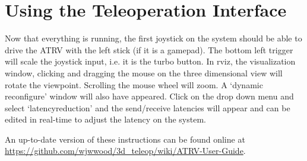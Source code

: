 \documentclass[12pt]{report}
\begin{document}
\section{Using the Teleoperation Interface}
Now that everything is running, the first joystick on the system should be able to drive the ATRV with the left stick (if it is a gamepad).  The bottom left trigger will scale the joystick input, i.e. it is the turbo button.  In rviz, the visualization window, clicking and dragging the mouse on the three dimensional view will rotate the viewpoint.  Scrolling the mouse wheel will zoom.  A `dynamic reconfigure' window will also have appeared.  Click on the drop down menu and select `latency\textunderscore{}reduction' and the send/receive latencies will appear and can be edited in real-time to adjust the latency on the system.

An up-to-date version of these instructions can be found online at \url{https://github.com/wjwwood/3d_teleop/wiki/ATRV-User-Guide}.
\end{document}
